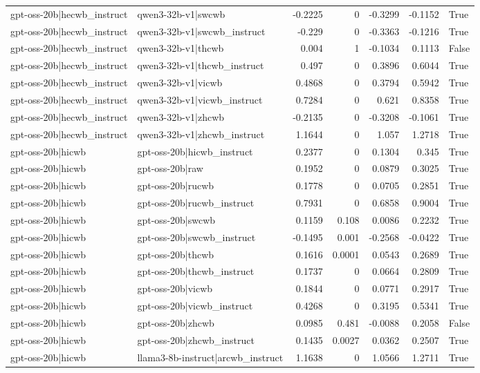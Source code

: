 \begin{table}
\begin{tabular}{l l r r r r l}
gpt-oss-20b|hecwb_instruct & qwen3-32b-v1|swcwb & -0.2225 & 0 & -0.3299 & -0.1152 & True \\
gpt-oss-20b|hecwb_instruct & qwen3-32b-v1|swcwb_instruct & -0.229 & 0 & -0.3363 & -0.1216 & True \\
gpt-oss-20b|hecwb_instruct & qwen3-32b-v1|thcwb & 0.004 & 1 & -0.1034 & 0.1113 & False \\
gpt-oss-20b|hecwb_instruct & qwen3-32b-v1|thcwb_instruct & 0.497 & 0 & 0.3896 & 0.6044 & True \\
gpt-oss-20b|hecwb_instruct & qwen3-32b-v1|vicwb & 0.4868 & 0 & 0.3794 & 0.5942 & True \\
gpt-oss-20b|hecwb_instruct & qwen3-32b-v1|vicwb_instruct & 0.7284 & 0 & 0.621 & 0.8358 & True \\
gpt-oss-20b|hecwb_instruct & qwen3-32b-v1|zhcwb & -0.2135 & 0 & -0.3208 & -0.1061 & True \\
gpt-oss-20b|hecwb_instruct & qwen3-32b-v1|zhcwb_instruct & 1.1644 & 0 & 1.057 & 1.2718 & True \\
gpt-oss-20b|hicwb & gpt-oss-20b|hicwb_instruct & 0.2377 & 0 & 0.1304 & 0.345 & True \\
gpt-oss-20b|hicwb & gpt-oss-20b|raw & 0.1952 & 0 & 0.0879 & 0.3025 & True \\
gpt-oss-20b|hicwb & gpt-oss-20b|rucwb & 0.1778 & 0 & 0.0705 & 0.2851 & True \\
gpt-oss-20b|hicwb & gpt-oss-20b|rucwb_instruct & 0.7931 & 0 & 0.6858 & 0.9004 & True \\
gpt-oss-20b|hicwb & gpt-oss-20b|swcwb & 0.1159 & 0.108 & 0.0086 & 0.2232 & True \\
gpt-oss-20b|hicwb & gpt-oss-20b|swcwb_instruct & -0.1495 & 0.001 & -0.2568 & -0.0422 & True \\
gpt-oss-20b|hicwb & gpt-oss-20b|thcwb & 0.1616 & 0.0001 & 0.0543 & 0.2689 & True \\
gpt-oss-20b|hicwb & gpt-oss-20b|thcwb_instruct & 0.1737 & 0 & 0.0664 & 0.2809 & True \\
gpt-oss-20b|hicwb & gpt-oss-20b|vicwb & 0.1844 & 0 & 0.0771 & 0.2917 & True \\
gpt-oss-20b|hicwb & gpt-oss-20b|vicwb_instruct & 0.4268 & 0 & 0.3195 & 0.5341 & True \\
gpt-oss-20b|hicwb & gpt-oss-20b|zhcwb & 0.0985 & 0.481 & -0.0088 & 0.2058 & False \\
gpt-oss-20b|hicwb & gpt-oss-20b|zhcwb_instruct & 0.1435 & 0.0027 & 0.0362 & 0.2507 & True \\
gpt-oss-20b|hicwb & llama3-8b-instruct|arcwb_instruct & 1.1638 & 0 & 1.0566 & 1.2711 & True \\

\end{tabular}
\end{table}
